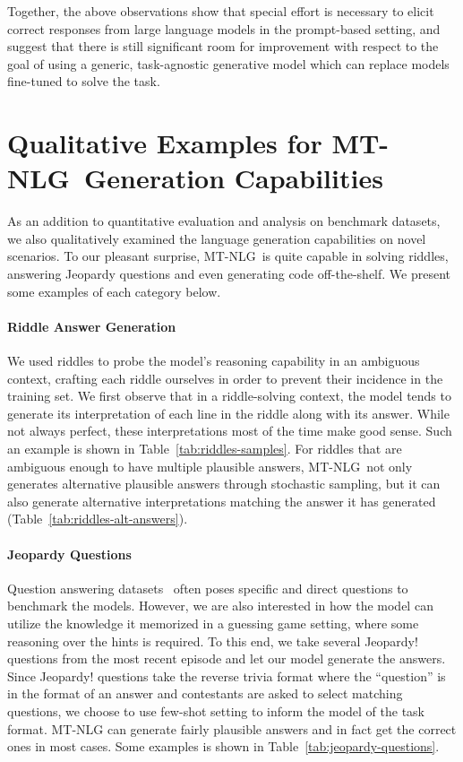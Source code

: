 \documentclass[11pt]{article}
\newcommand{\ours}{MT-NLG}
\begin{document}
Together, the above observations show that special effort is necessary to elicit correct responses from large language models in the prompt-based setting, and suggest that there is still significant room for improvement with respect to the goal of using a generic, task-agnostic generative model which can replace models fine-tuned to solve the task.


\section{Qualitative Examples for \ours~Generation Capabilities}
\label{sec:gen_capa}
As an addition to quantitative evaluation and analysis on benchmark datasets, we also qualitatively examined the language generation capabilities on novel scenarios. To our pleasant surprise, \ours~is quite capable in solving riddles, answering Jeopardy questions and even generating code off-the-shelf. We present some examples of each category below.

\paragraph{Riddle Answer Generation}

We used riddles to probe the model's reasoning capability in an ambiguous context, crafting each riddle ourselves in order to prevent their incidence in the training set. We first observe that in a riddle-solving context, the model tends to generate its interpretation of each line in the riddle along with its answer. While not always perfect, these interpretations most of the time make good sense. Such an example is shown in Table~\ref{tab:riddles-samples}. For riddles that are ambiguous enough to have multiple plausible answers, \ours~not only generates alternative plausible answers through stochastic sampling, but it can also generate alternative interpretations matching the answer it has generated (Table~\ref{tab:riddles-alt-answers}).

\paragraph{Jeopardy Questions}

Question answering datasets~\citep{kwiatkowski2019naturalquestions,Joshi2017TriviaQAAL} often poses specific and direct questions to benchmark the models. However, we are also interested in how the model can utilize the knowledge it memorized in a guessing game setting, where some reasoning over the hints is required. To this end, we take several Jeopardy! questions from the most recent episode and let our model generate the answers. Since Jeopardy! questions take the reverse trivia format where the ``question'' is in the format of an answer and contestants are asked to select matching questions, we choose to use few-shot setting to inform the model of the task format. {\ours} can generate fairly plausible answers and in fact get the correct ones in most cases. Some examples is shown in Table~\ref{tab:jeopardy-questions}.
\end{document}
